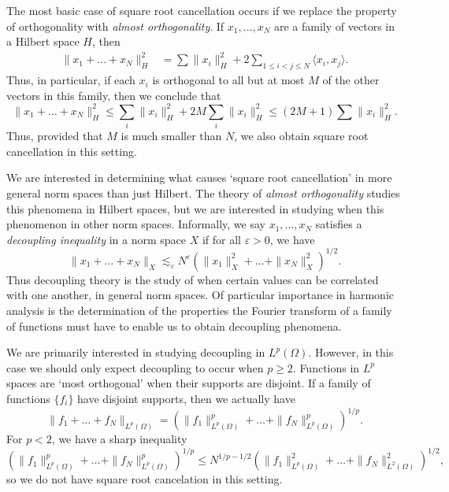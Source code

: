 The most basic case of square root cancellation occurs if we replace the property of orthogonality with \emph{almost orthogonality}. If $x_1, \dots, x_N$ are a family of vectors in a Hilbert space $H$, then
%
\begin{align*}
  \| x_1 + \dots + x_N \|_H^2 &= \sum \| x_i \|_H^2 + 2 \sum_{1 \leq i < j \leq N} \langle x_i, x_j \rangle.
\end{align*}
%
Thus, in particular, if each $x_i$ is orthogonal to all but at most $M$ of the other vectors in this family, then we conclude that
%
\[ \| x_1 + \dots + x_N \|_H^2 \leq \sum_i \| x_i \|_H^2 + 2M \sum_i \| x_i \|_H^2 \leq (2M + 1) \sum \| x_i \|_H^2. \]
%
Thus, provided that $M$ is much smaller than $N$, we also obtain square root cancellation in this setting.

We are interested in determining what causes `square root cancellation' in more general norm spaces than just Hilbert. The theory of \emph{almost orthogonality} studies this phenomena in Hilbert spaces, but we are interested in studying when this phenomenon in other norm spaces. Informally, we say $x_1, \dots, x_N$ satisfies a \emph{decoupling inequality} in a norm space $X$ if for all $\varepsilon > 0$, we have
%
\[ \| x_1 + \dots + x_N \|_X \lesssim_\varepsilon N^\varepsilon \left( \| x_1 \|_X^2 + \dots + \| x_N \|_X^2 \right)^{1/2}. \]
%
Thus decoupling theory is the study of when certain values can be correlated with one another, in general norm spaces. Of particular importance in harmonic analysis is the determination of the properties the Fourier transform of a family of functions must have to enable us to obtain decoupling phenomena.

\begin{remark}
  We are primarily interested in studying decoupling in $L^p(\Omega)$. However, in this case we should only expect decoupling to occur when $p \geq 2$. Functions in $L^p$ spaces are `most orthogonal' when their supports are disjoint. If a family of functions $\{ f_i \}$ have disjoint supports, then we actually have
  \[ \| f_1 + \dots + f_N \|_{L^p(\Omega)} = \left( \| f_1 \|_{L^p(\Omega)}^p + \dots + \| f_N \|_{L^p(\Omega)}^p \right)^{1/p}. \]
  For $p < 2$, we have a sharp inequality
  \[ \left( \| f_1 \|_{L^p(\Omega)}^p + \dots + \| f_N \|_{L^p(\Omega)}^p \right)^{1/p} \leq N^{1/p - 1/2} \left( \| f_1 \|_{L^p(\Omega)}^2 + \dots + \| f_N \|_{L^2(\Omega)}^2 \right)^{1/2}, \]
  so we do not have square root cancelation in this setting.
\end{remark}

